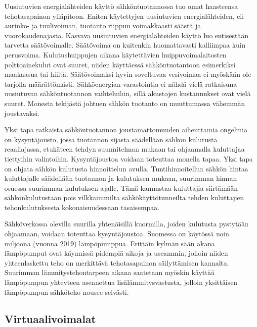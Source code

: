   Uusiutuvien energialähteiden käyttö sähköntuotannossa tuo omat haasteensa tehotasapainon ylläpitoon. Eniten käytettyjen uusiutuvien energialähteiden, eli aurinko- ja tuulivoiman, tuotanto riippuu voimakkaasti säästä ja vuorokaudenajasta. Kasvava uusiutuvien energialähteiden käyttö luo entisestään tarvetta säätövoimalle.\parencite{energiateollisuus} Säätövoima on kuitenkin huomattavasti kalliimpaa kuin perusvoima. Kulutushuippujen aikana käytettävien huippuvoimalaitosten polttoainekulut ovat suuret, niiden käyttäessä sähköntuotantoon esimerkiksi maakaasua tai hiiltä. Säätövoimaksi hyvin soveltuvaa vesivoimaa ei myöskään ole tarjolla määrättömästi. Sähköenergian varastointia ei nähdä vielä ratkaisuna uusiutuvan sähköntuotannon vaihteluihin, sillä akustojen kustannukset ovat vielä suuret. Monesta tekijästä johtuen sähkön tuotanto on muuttumassa vähemmän joustavaksi.

  Yksi tapa ratkaista sähköntuotannon joustamattomuuden aiheuttamia ongelmia on kysyntäjousto, jossa tuotannon sijasta säädellään sähkön kulutusta reaaliajassa, etukäteen tehdyn suunnitelman mukaan tai ohjaamalla kuluttajaa tiettyihin valintoihin. Kysyntäjoustoa voidaan toteuttaa monella tapaa.\parencite{fingrid} Yksi tapa on ohjata sähkön kulutusta hinnoittelun avulla. Tuntihinnoitellun sähkön hintaa kuluttajalle säädellään tuotannon ja kulutuksen mukaan, suurimman hinnan osuessa suurimman kulutuksen ajalle. Tämä kannustaa kuluttajia siirtämään sähkönkulutustaan pois vilkkaimmilta sähkökäyttötunneilta tehden kuluttajien tehonkulutuksesta kokonaisuudessaan tasaisempaa.

  Sähköverkossa olevilla suurilla yhtenäisillä kuormilla, joiden kulutusta pystytään ohjaamaan, voidaan toteuttaa kysyntäjoustoa\parencite{fingrid}. Suomessa on käytössä noin miljoona (vuonna 2019) lämpöpumppua\parencite{sulpu}. Erittäin kylmän sään akana lämpöpumput ovat käynnissä pidempiä aikoja ja useammin, jolloin niiden yhteenlaskettu teho on merkittävä tehotasapainon säilyttämisen kannalta. Suurimman lämmitystehontarpeen aikana saatetaan myöskin käyttää lämpöpumpun yhteyteen asennettua lisälämmitysvastusta, jolloin yksittäisen lämpöpumpun sähköteho nousee selvästi.

\subsection{Virtuaalivoimalat}

